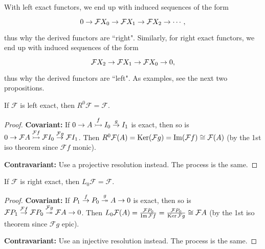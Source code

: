 \documentclass[twoside,10pt]{report}
\begin{document}
With left exact functors, we end up with induced sequences of the form
\[
\begin{tikzcd}
	0 \to \mathcal{F}X_0 \to \mathcal{F}X_1 \to \mathcal{F}X_2 \to \cdots,
\end{tikzcd}
\] thus why the derived functors are ``right". Similarly, for right exact functors, we end up with induced sequences of the form
\[
\begin{tikzcd}
	\mathcal{F}X_2 \to \mathcal{F}X_1\to \mathcal{F}X_0\to 0,
\end{tikzcd}
\] thus why the derived functors are ``left". As examples, see the next two propositions.




\begin{prop}
	\label{left-exact-right-0}
	If $\mathcal{F}$ is left exact, then $R^0\mathcal{F}=\mathcal{F}$.
\end{prop}
\begin{proof}
	\textbf{Covariant:} If $0\to A\stackrel{f}{\rightarrowtail } I_0 \stackrel{g}{\to } I_1$ is exact, then so is $0\to \mathcal{F}A\stackrel{\mathcal{F}f}{\rightarrowtail } \mathcal{F}I_0\stackrel{\mathcal{F}g}{\to } \mathcal{F}I_1 $. Then $R^{0}\mathcal{F}(A) = \operatorname{Ker} (\mathcal{F}g) = \operatorname{Im} (\mathcal{F}f) \cong \mathcal{F}(A)$ (by the 1st iso theorem since $\mathcal{F}f$ monic).

	\textbf{Contravariant:} Use a projective resolution instead. The process is the same.
\end{proof}

\begin{prop}
	\label{right-exact-left-0}
	If $\mathcal{F}$ is right exact, then $L_0\mathcal{F} = \mathcal{F}$.
\end{prop}
\begin{proof}
	\textbf{Covariant:} If $P_1\stackrel{f}{\to } P_0\stackrel{g }{\twoheadrightarrow } A\to 0$ is exact, then so is $\mathcal{F}P_1\stackrel{\mathcal{F}f}{\to } \mathcal{F}P_0\stackrel{\mathcal{F}g}{\twoheadrightarrow } \mathcal{F}A\to 0$. Then $L_0\mathcal{F}(A) = \frac{\mathcal{F}P_0}{\operatorname{Im} \mathcal{F}f} = \frac{\mathcal{F}P_0}{\operatorname{Ker} \mathcal{F}g} \cong \mathcal{F}A$ (by the 1st iso theorem since $\mathcal{F}g$ epic).

	\textbf{Contravariant:} Use an injective resolution instead. The process is the same.
\end{proof}
\end{document}
